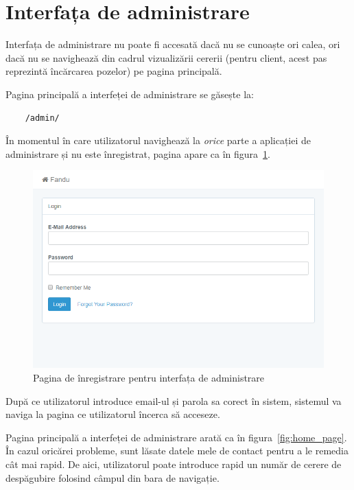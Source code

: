 \pagebreak
\section{Interfața de administrare}

	Interfața de administrare nu poate fi accesată dacă nu se cunoaște ori calea, ori dacă nu se navighează din cadrul vizualizării cererii (pentru client, acest pas reprezintă încărcarea pozelor) pe pagina principală.

	Pagina principală a interfeței de administrare se găsește la:

	\begin{verbatim}
	/admin/
	\end{verbatim}

	În momentul în care utilizatorul navighează la \textit{orice} parte a aplicației de administrare și nu este înregistrat, pagina apare ca în figura~\ref{fig:login}.
	\begin{figure}
		\includegraphics[width=\linewidth]{../imagini/login.png}
		\caption{Pagina de înregistrare pentru interfața de administrare}
		\label{fig:login}
	\end{figure}

	După ce utilizatorul introduce email-ul și parola sa corect în sistem, sistemul va naviga la pagina ce utilizatorul încerca să acceseze.

	Pagina principală a interfeței de administrare arată ca în figura~\ref{fig:home_page}.
	În cazul oricărei probleme, sunt lăsate datele mele de contact pentru a le remedia cât mai rapid.
	De aici, utilizatorul poate introduce rapid un număr de cerere de despăgubire folosind câmpul din bara de navigație.


